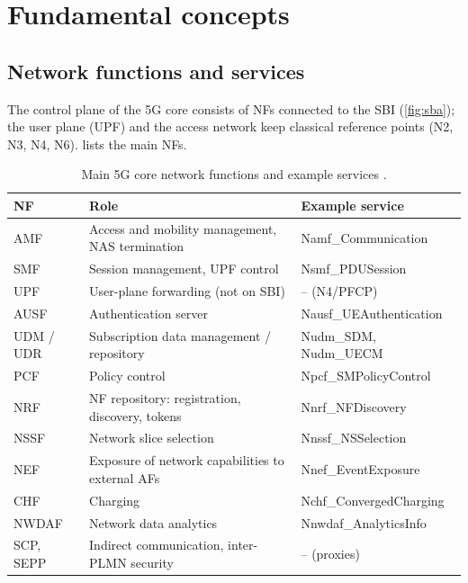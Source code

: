 \documentclass[11pt,a4paper]{article}
\begin{document}
\section{Fundamental concepts}

\subsection{Network functions and services}
The control plane of the 5G core consists of NFs connected to the SBI (\cref{fig:sba}); the user plane (UPF) and the
access network keep classical reference points (N2, N3, N4, N6).  lists the main NFs.

\begin{table}[htbp]
\centering\small
\caption{Main 5G core network functions and example services \cite{ts23501}.}\label{tab:nfs}
\begin{tabularx}{\linewidth}{@{}l Y l@{}}
\toprule
{}NF & Role & Example service \\
\midrule
AMF  & Access and mobility management, NAS termination      & Namf\_Communication \\
SMF  & Session management, UPF control                      & Nsmf\_PDUSession \\
UPF  & User-plane forwarding (not on SBI)                   & -- (N4/PFCP) \\
AUSF & Authentication server                                & Nausf\_UEAuthentication \\
UDM / UDR & Subscription data management / repository       & Nudm\_SDM, Nudm\_UECM \\
PCF  & Policy control                                       & Npcf\_SMPolicyControl \\
NRF  & NF repository: registration, discovery, tokens       & Nnrf\_NFDiscovery \\
NSSF & Network slice selection                              & Nnssf\_NSSelection \\
NEF  & Exposure of network capabilities to external AFs     & Nnef\_EventExposure \\
CHF  & Charging                                             & Nchf\_ConvergedCharging \\
NWDAF & Network data analytics                              & Nnwdaf\_AnalyticsInfo \\
SCP, SEPP & Indirect communication, inter-PLMN security     & -- (proxies) \\
\bottomrule
\end{tabularx}
\end{table}
\end{document}
